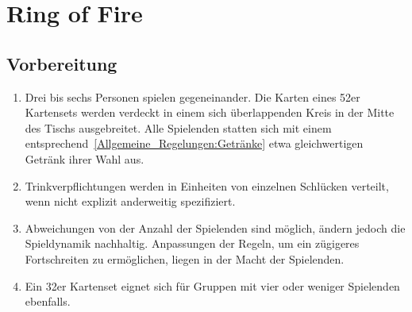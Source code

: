 \chapter{Ring of Fire}
\section{Vorbereitung}
\begin{enumerate}[label={(\arabic*)}]
	\item
	Drei bis sechs Personen spielen gegeneinander.
	Die Karten eines 52er Kartensets werden verdeckt in einem sich überlappenden Kreis in der Mitte des Tischs ausgebreitet.
	Alle Spielenden statten sich mit einem entsprechend~\ref{Allgemeine_Regelungen:Getränke} etwa gleichwertigen Getränk ihrer Wahl aus.

	\item
	Trinkverpflichtungen werden in Einheiten von einzelnen Schlücken verteilt, wenn nicht explizit anderweitig spezifiziert.

	\item
	Abweichungen von der Anzahl der Spielenden sind möglich, ändern jedoch die Spieldynamik nachhaltig. Anpassungen der Regeln, um ein zügigeres Fortschreiten zu ermöglichen, liegen in der Macht der Spielenden.

	\item
	Ein 32er Kartenset eignet sich für Gruppen mit vier oder weniger Spielenden ebenfalls.
\end{enumerate}

